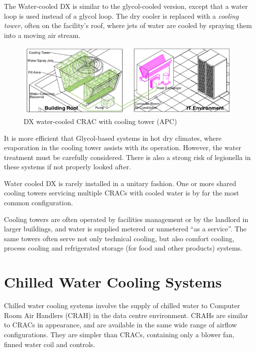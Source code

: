 \documentclass{pgnotes}
\begin{document}
The Water-cooled DX is similar to the glycol-cooled version, except that a water loop is used instead of a glycol loop.
The dry cooler is replaced with a \textit{cooling tower}, often on the facility's roof, where jets of water are cooled by spraying them into a moving air stream. 

\begin{figure}[hptb]
  \centering
  \includegraphics[width=1.0\linewidth]{crac_dx_water_schematic}
  \caption{DX water-cooled CRAC with cooling tower (APC)}
  \label{fig:crac-dx-water-schematic}
\end{figure}

It is more efficient that Glycol-based systems in hot dry climates, where evaporation in the cooling tower assists with its operation.
However, the water treatment must be carefully considered.
There is also a strong risk of legionella in these systems if not properly looked after.

Water cooled DX is rarely installed in a unitary fashion.
One or more shared cooling towers servicing multiple CRACs with cooled water is by far the most common configuration.

Cooling towers are often operated by facilities management or by the landlord in larger buildings, and water is supplied metered or unmetered ``as a service''.
The same towers often serve not only technical cooling, but also comfort cooling, process cooling and refrigerated storage (for food and other products) systems.


\newpage
\section{Chilled Water Cooling Systems}

Chilled water cooling systems involve the supply of chilled water to Computer Room Air Handlers (CRAH) in the data centre environment.
CRAHs are similar to CRACs in appearance, and are available in the same wide range of airflow configurations.
They are simpler than CRACs, containing only a blower fan, finned water coil and controls.
\end{document}
